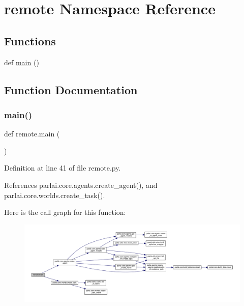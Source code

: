 \hypertarget{namespaceremote}{}\section{remote Namespace Reference}
\label{namespaceremote}
\subsection*{Functions}
\begin{DoxyCompactItemize}
\item 
def \hyperlink{namespaceremote_aa8eb15effdae452b1fde3639cd9bc267}{main} ()
\end{DoxyCompactItemize}


\subsection{Function Documentation}
\mbox{\label{namespaceremote_aa8eb15effdae452b1fde3639cd9bc267}} 
\subsubsection{\texorpdfstring{main()}{main()}}
{\footnotesize\ttfamily def remote.\+main (\begin{DoxyParamCaption}{ }\end{DoxyParamCaption})}



Definition at line 41 of file remote.\+py.



References parlai.\+core.\+agents.\+create\+\_\+agent(), and parlai.\+core.\+worlds.\+create\+\_\+task().

Here is the call graph for this function\+:
\nopagebreak
\begin{figure}[H]
\begin{center}
\leavevmode
\includegraphics[width=350pt]{namespaceremote_aa8eb15effdae452b1fde3639cd9bc267_cgraph}
\end{center}
\end{figure}
